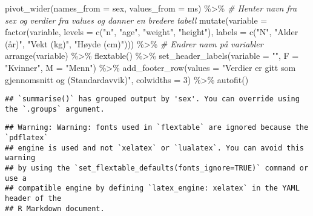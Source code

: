 \documentclass[
]{article}
\newenvironment{Shaded}{\begin{snugshade}}{\end{snugshade}}
\newcommand{\AttributeTok}[1]{\textcolor[rgb]{0.77,0.63,0.00}{#1}}
\newcommand{\CommentTok}[1]{\textcolor[rgb]{0.56,0.35,0.01}{\textit{#1}}}
\newcommand{\DecValTok}[1]{\textcolor[rgb]{0.00,0.00,0.81}{#1}}
\newcommand{\FunctionTok}[1]{\textcolor[rgb]{0.00,0.00,0.00}{#1}}
\newcommand{\NormalTok}[1]{#1}
\newcommand{\SpecialCharTok}[1]{\textcolor[rgb]{0.00,0.00,0.00}{#1}}
\newcommand{\StringTok}[1]{\textcolor[rgb]{0.31,0.60,0.02}{#1}}
\begin{document}
\begin{Shaded}
\begin{Highlighting}[]
   \FunctionTok{pivot\_wider}\NormalTok{(}\AttributeTok{names\_from =}\NormalTok{ sex, }
              \AttributeTok{values\_from =}\NormalTok{ ms) }\SpecialCharTok{\%\textgreater{}\%} \CommentTok{\# Henter navn fra sex og verdier fra values og danner en bredere tabell}
   \FunctionTok{mutate}\NormalTok{(}\AttributeTok{variable =} \FunctionTok{factor}\NormalTok{(variable, }\AttributeTok{levels =} \FunctionTok{c}\NormalTok{(}\StringTok{"n"}\NormalTok{, }\StringTok{"age"}\NormalTok{, }\StringTok{"weight"}\NormalTok{, }\StringTok{"height"}\NormalTok{), }\AttributeTok{labels =} \FunctionTok{c}\NormalTok{(}\StringTok{"N"}\NormalTok{, }\StringTok{"Alder (år)"}\NormalTok{, }\StringTok{"Vekt (kg)"}\NormalTok{, }\StringTok{"Høyde (cm)"}\NormalTok{))) }\SpecialCharTok{\%\textgreater{}\%} \CommentTok{\# Endrer navn på variabler }
  \FunctionTok{arrange}\NormalTok{(variable) }\SpecialCharTok{\%\textgreater{}\%} 
   \FunctionTok{flextable}\NormalTok{()  }\SpecialCharTok{\%\textgreater{}\%}
   \FunctionTok{set\_header\_labels}\NormalTok{(}\AttributeTok{variable =} \StringTok{""}\NormalTok{,}
                    \AttributeTok{F =} \StringTok{"Kvinner"}\NormalTok{, }\AttributeTok{M =} \StringTok{"Menn"}\NormalTok{) }\SpecialCharTok{\%\textgreater{}\%}
  \FunctionTok{add\_footer\_row}\NormalTok{(}\AttributeTok{values =} \StringTok{"Verdier er gitt som gjennomsnitt og (Standardavvik)"}\NormalTok{, }\AttributeTok{colwidths =} \DecValTok{3}\NormalTok{) }\SpecialCharTok{\%\textgreater{}\%}
   \FunctionTok{autofit}\NormalTok{()}
\end{Highlighting}
\end{Shaded}

\begin{verbatim}
## `summarise()` has grouped output by 'sex'. You can override using the `.groups` argument.
\end{verbatim}

\begin{verbatim}
## Warning: Warning: fonts used in `flextable` are ignored because the `pdflatex`
## engine is used and not `xelatex` or `lualatex`. You can avoid this warning
## by using the `set_flextable_defaults(fonts_ignore=TRUE)` command or use a
## compatible engine by defining `latex_engine: xelatex` in the YAML header of the
## R Markdown document.
\end{verbatim}

\providecommand{\docline}[3]{\noalign{\global\setlength{\arrayrulewidth}{#1}}\arrayrulecolor[HTML]{#2}\cline{#3}}

\setlength{\tabcolsep}{2pt}
\end{document}
